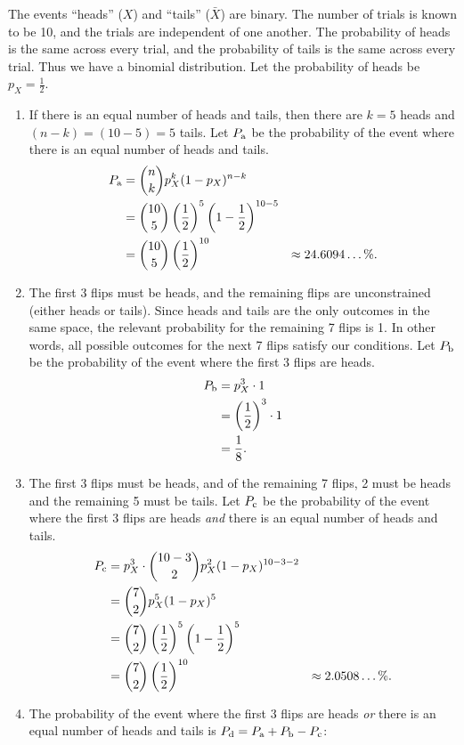 \documentclass{article}
\theoremstyle{definition}
\begin{document}
\begin{solution}
The events ``heads'' ($X$) and ``tails'' ($\bar{X}$) are binary. The number of trials is known to be 10, and the trials are independent of one another. The probability of heads is the same across every trial, and the probability of tails is the same across every trial. Thus we have a binomial distribution. Let the probability of heads be $p_X=\frac{1}{2}$.
\begin{enumerate}
\item If there is an equal number of heads and tails, then there are $k=5$ heads and $(n-k)=(10-5)=5$ tails. Let $P_{\rm a}$ be the probability of the event where there is an equal number of heads and tails.
\begin{align*}
P_{\rm a}
&=\binom{n}{k}p_X^k(1-p_X)^{n-k}\\
&=\binom{10}{5}\left(\frac{1}{2}\right)^5\left(1-\frac{1}{2}\right)^{10-5}\\
&=\binom{10}{5}\left(\frac{1}{2}\right)^{10}
&\approx 24.6094\dots\%.
\end{align*}
\item The first 3 flips must be heads, and the remaining flips are unconstrained (either heads or tails). Since heads and tails are the only outcomes in the same space, the relevant probability for the remaining 7 flips is 1. In other words, all possible outcomes for the next 7 flips satisfy our conditions. Let $P_{\rm b}$ be the probability of the event where the first 3 flips are heads.
\begin{align*}
P_{\rm b}
&=p_X^3\cdot 1\\
&=\left(\frac{1}{2}\right)^3\cdot 1\\
&=\frac{1}{8}.
\end{align*}
\item The first 3 flips must be heads, and of the remaining 7 flips, 2 must be heads and the remaining 5 must be tails. Let $P_{\rm c}$ be the probability of the event where the first 3 flips are heads\textit{ and }there is an equal number of heads and tails.
\begin{align*}
P_{\rm c}
&=p_X^3\cdot\binom{10-3}{2}p_X^{2}(1-p_X)^{10-3-2}\\
&=\binom{7}{2}p_X^5(1-p_X)^5\\
&=\binom{7}{2}\left(\frac{1}{2}\right)^5\left(1-\frac{1}{2}\right)^5\\
&=\binom{7}{2}\left(\frac{1}{2}\right)^{10}
&\approx 2.0508\dots\%.
\end{align*}
\item The probability of the event where the first 3 flips are heads\textit{ or }there is an equal number of heads and tails is $P_{\rm d}=P_{\rm a}+P_{\rm b}-P_{\rm c}$:

\end{enumerate}
\end{solution}
\end{document}
